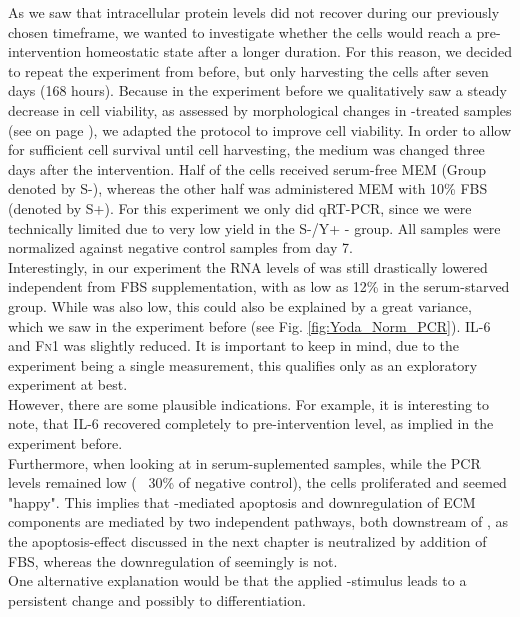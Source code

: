 As we saw that intracellular \colone{} protein levels did not recover during our previously chosen timeframe, we wanted to investigate whether the cells would reach a pre-intervention homeostatic state after a longer duration. For this reason, we decided to repeat the experiment from before, but only harvesting the cells after seven days (168 hours). Because in the experiment before we qualitatively saw a steady decrease in cell viability, as assessed by morphological changes in \Yoda{}-treated samples (see on page \pageref{pic:Yoda_Apop}), we adapted the protocol to improve cell viability. In order to allow for sufficient cell survival until cell harvesting, the medium was changed three days after the intervention. Half of the cells received serum-free MEM\textalpha{} (Group denoted by S-), whereas the other half was administered MEM\textalpha{} with 10\% FBS (denoted by S+). For this experiment we only did qRT-PCR, since we were technically limited due to very low yield in the S-/Y+ - group. All samples were normalized against negative control samples from day 7.\\
Interestingly, in our experiment the RNA levels of \colone{} was still drastically lowered independent from FBS supplementation, with as low as 12\% in the serum-starved group. While \colthree{} was also low, this could also be explained by a great variance, which we saw in the experiment before (see Fig. \ref{fig:Yoda_Norm_PCR}). IL-6 and \textsc{Fn}1 was slightly reduced. It is important to keep in mind, due to the experiment being a single measurement, this qualifies only as an exploratory experiment at best.\\
However, there are some plausible indications. For example, it is interesting to note, that IL-6 recovered completely to pre-intervention level, as implied in the experiment before. \\
Furthermore, when looking at \colone{} in serum-suplemented samples, while the PCR levels remained low (~ 30\% of negative control), the cells proliferated and seemed "happy". This implies that \Piezo{}-mediated apoptosis and downregulation of ECM components are mediated by two independent pathways, both downstream of \Piezo{}, as the apoptosis-effect discussed in the next chapter is neutralized by addition of FBS, whereas the downregulation of \colone{} seemingly is not.\\
One alternative explanation would be that the applied \Yoda{}-stimulus leads to a persistent change and possibly to differentiation.\par

